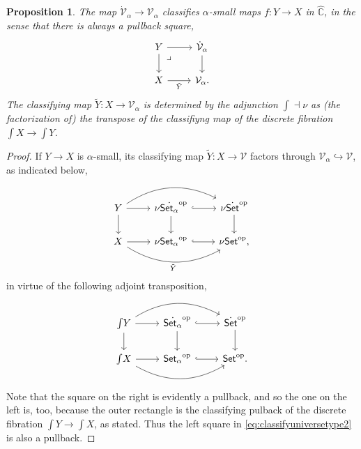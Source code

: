 \documentclass[11pt]{amsart}
\newcommand{\bbC}{\ensuremath{\mathbb{C}}}
\newcommand{\Set}{\ensuremath{\mathsf{Set}}}
\newcommand{\op}[1]{\ensuremath{{#1}^{\mathrm{op}}}}
\newcommand{\hook}{\ensuremath{\hookrightarrow}}
\renewcommand{\to}{\ensuremath{\rightarrow}}
\newcommand{\elem}[1]{\textstyle\int\!{#1}}%
\newcommand{\V}{\ensuremath{\mathcal{V}}}
\newcommand{\VV}{\ensuremath{\dot{\mathcal{V}}}}
\newtheorem{proposition}[theorem]{Proposition}
\theoremstyle{remark}
\theoremstyle{definition}
\newcommand{\pbmark}{\ar[dr, phantom, "\lrcorner" very near start, shift right=.5ex]}	%
\begin{document}
 \begin{proposition}\label{prop:familyclassifier}
The map $\VV_\alpha\to\V_\alpha$ classifies $\alpha$-small maps $f:Y\to X$ in $\widehat{\bbC}$, in the sense that there is always a pullback square,
\begin{equation}\label{eq:classifyuniversefamilyalpha}\textstyle
\begin{tikzcd}
	 Y \ar[d] \pbmark \ar[r] & \VV_\alpha \ar[d] \\  
	X \ar[r,swap, "\tilde{Y}"] &  \V_\alpha.
 \end{tikzcd}
 \end{equation}
The classifying map $\tilde{Y} : X\to \V_\alpha$ is determined by the adjunction $\int \dashv \nu$ as (the factorization of) the transpose of the classifiyng map of the discrete fibration $\elem X\to\elem Y$. 
\end{proposition}

\begin{proof} If $Y\to X$ is $\alpha$-small, its classifying map $\tilde{Y} : X\to\V$ factors through $\V_\alpha \hook \V$, as indicated below, 
\begin{equation}\label{eq:classifyuniversetype2}\textstyle
\begin{tikzcd}
	 Y \ar[d] \ar[rr, bend left] \ar[r] & \nu\op{\dot{\Set_\alpha}} \ar[d] \ar[r,hook] & \nu\op{\dot{\Set}} \ar[d]\\  
	X \ar[rr, bend right, swap,"\tilde{Y}"] \ar[r] &  \nu\op{\Set_\alpha} \ar[r,hook] &  \nu\op{\Set},
 \end{tikzcd}
 \end{equation}
%
in virtue of the following adjoint transposition,
\begin{equation}\label{eq:adjointtranspose}\textstyle
\begin{tikzcd}
	 \elem Y \ar[d] \ar[rr, bend left] \ar[r] & \op{\dot{\Set_\alpha}} \ar[d] \ar[r,hook] & \op{\dot{\Set}} \ar[d]\\  
	 \elem X \ar[rr, bend right, ] \ar[r]  &  \op{\Set_\alpha} \ar[r,hook]  &  \op{\Set}.
 \end{tikzcd}
  \end{equation}
Note that the square on the right is evidently a pullback, and so the one on the left is, too, because the outer rectangle is the classifying pulback of the discrete fibration $\elem Y \to \elem X$, as stated.  Thus the left square in \eqref{eq:classifyuniversetype2} is also a pullback.
\end{proof}

\end{document}
